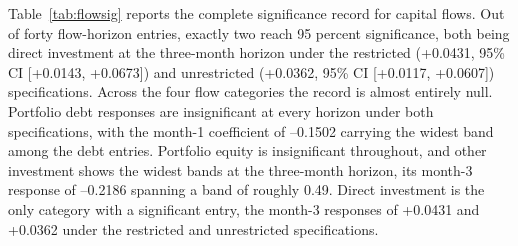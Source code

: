 Table~\ref{tab:flowsig} reports the complete significance record for capital flows. Out of forty flow-horizon entries, exactly two reach 95 percent significance, both being direct investment at the three-month horizon under the restricted (+0.0431, 95\% CI [+0.0143, +0.0673]) and unrestricted (+0.0362, 95\% CI [+0.0117, +0.0607]) specifications. Across the four flow categories the record is almost entirely null. Portfolio debt responses are insignificant at every horizon under both specifications, with the month-1 coefficient of --0.1502 carrying the widest band among the debt entries. Portfolio equity is insignificant throughout, and other investment shows the widest bands at the three-month horizon, its month-3 response of --0.2186 spanning a band of roughly 0.49. Direct investment is the only category with a significant entry, the month-3 responses of +0.0431 and +0.0362 under the restricted and unrestricted specifications.

